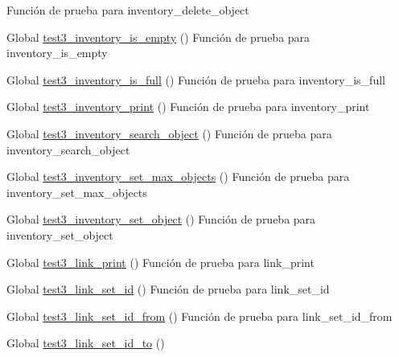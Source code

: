 \begin{DoxyRefList}
%
Función de prueba para inventory\+\_\+delete\+\_\+object  
\item[Global \mbox{\hyperlink{inventory__test_8c_a9c8daeb141dbec6ddd5621edade53091}{test3\+\_\+inventory\+\_\+is\+\_\+empty}} ()]\label{test__test000087}%
%
Función de prueba para inventory\+\_\+is\+\_\+empty  
\item[Global \mbox{\hyperlink{inventory__test_8c_a540dbcbfd29bd63590d081e496f8227f}{test3\+\_\+inventory\+\_\+is\+\_\+full}} ()]\label{test__test000090}%
%
Función de prueba para inventory\+\_\+is\+\_\+full  
\item[Global \mbox{\hyperlink{inventory__test_8c_a61946792fc191994e1d93674df794cbd}{test3\+\_\+inventory\+\_\+print}} ()]\label{test__test000079}%
%
Función de prueba para inventory\+\_\+print  
\item[Global \mbox{\hyperlink{inventory__test_8c_a1ef29f251219dba3188917159cf5b73c}{test3\+\_\+inventory\+\_\+search\+\_\+object}} ()]\label{test__test000093}%
%
Función de prueba para inventory\+\_\+search\+\_\+object  
\item[Global \mbox{\hyperlink{inventory__test_8c_a270c2d6aecda0d73fbcff6ca0c9a90db}{test3\+\_\+inventory\+\_\+set\+\_\+max\+\_\+objects}} ()]\label{test__test000098}%
%
Función de prueba para inventory\+\_\+set\+\_\+max\+\_\+objects  
\item[Global \mbox{\hyperlink{inventory__test_8c_afeec9d3504d3663c7fb8884e1bb1562d}{test3\+\_\+inventory\+\_\+set\+\_\+object}} ()]\label{test__test000070}%
%
Función de prueba para inventory\+\_\+set\+\_\+object  
\item[Global \mbox{\hyperlink{link__test_8c_a3142c89c0e0ddb961b03ed04d94b8995}{test3\+\_\+link\+\_\+print}} ()]\label{test__test000129}%
%
Función de prueba para link\+\_\+print  
\item[Global \mbox{\hyperlink{link__test_8c_ac4d98b2913728aeb1fe6735ac96bb25a}{test3\+\_\+link\+\_\+set\+\_\+id}} ()]\label{test__test000107}%
%
Función de prueba para link\+\_\+set\+\_\+id  
\item[Global \mbox{\hyperlink{link__test_8c_a009c187bec3c13f4605e88b202ef0dae}{test3\+\_\+link\+\_\+set\+\_\+id\+\_\+from}} ()]\label{test__test000117}%
%
Función de prueba para link\+\_\+set\+\_\+id\+\_\+from  
\item[Global \mbox{\hyperlink{link__test_8c_a794995376a971d30e0fed03287ca372f}{test3\+\_\+link\+\_\+set\+\_\+id\+\_\+to}} ()]\label{test__test000122}%

\end{DoxyRefList}
